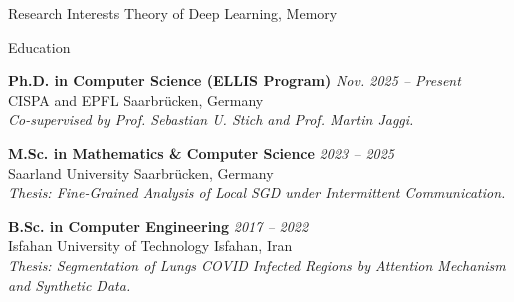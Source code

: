 \documentclass{resume}
\begin{document}
\begin{rSection}{Research Interests}
Theory of Deep Learning, Memory
\end{rSection}

\begin{rSection}{Education}

{\bfseries Ph.D. in Computer Science (ELLIS Program)} \hfill {\em Nov. 2025 -- Present} \\
CISPA and EPFL \hfill Saarbr\"ucken, Germany \\
\textit{Co-supervised by Prof. Sebastian U. Stich and Prof. Martin Jaggi.}
\par\smallskip

{\bfseries M.Sc. in Mathematics \& Computer Science} \hfill {\em 2023 -- 2025} \\
Saarland University \hfill Saarbr\"ucken, Germany \\
\textit{Thesis: Fine-Grained Analysis of Local SGD under Intermittent Communication.}
\par\smallskip

{\bfseries B.Sc. in Computer Engineering} \hfill {\em 2017 -- 2022} \\
Isfahan University of Technology \hfill Isfahan, Iran \\
\textit{Thesis: Segmentation of Lungs COVID Infected Regions by Attention Mechanism and Synthetic Data.}

\end{rSection}
\end{document}
